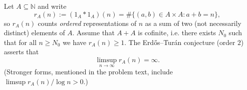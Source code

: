 Let $A\subseteq\mathbb{N}$ and write
\[
 r_A(n) := (1_A\ast 1_A)(n)=\#\{(a,b)\in A\times A: a+b=n\},
\]
so $r_A(n)$ counts \emph{ordered} representations of $n$ as a sum of two (not necessarily distinct) elements of $A$.
Assume that $A+A$ is cofinite, i.e. there exists $N_0$ such that for all $n\ge N_0$ we have $r_A(n)\ge 1$.
The Erdős--Turán conjecture (order $2$) asserts that
\[
\limsup_{n\to\infty} r_A(n)=\infty.
\]
(Stronger forms, mentioned in the problem text, include $\limsup r_A(n)/\log n>0$.)
